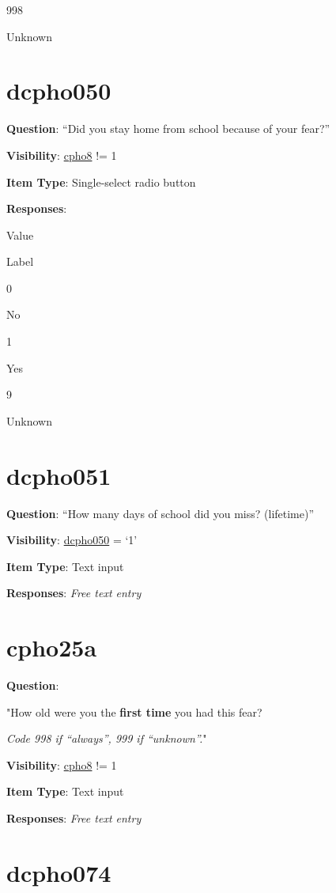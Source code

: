 \documentclass[]{book}
\begin{document}
998

Unknown

\hypertarget{dcpho050}{%
\section{dcpho050}\label{dcpho050}}

\textbf{Question}: ``Did you stay home from school because of your fear?''

\textbf{Visibility}: \protect\hyperlink{cpho8}{cpho8} != 1

\textbf{Item Type}: Single-select radio button

\textbf{Responses}:

Value

Label

0

No

1

Yes

9

Unknown

\hypertarget{dcpho051}{%
\section{dcpho051}\label{dcpho051}}

\textbf{Question}: ``How many days of school did you miss? (lifetime)''

\textbf{Visibility}: \protect\hyperlink{dcpho050}{dcpho050} = `1'

\textbf{Item Type}: Text input

\textbf{Responses}: \emph{Free text entry}

\hypertarget{cpho25a}{%
\section{cpho25a}\label{cpho25a}}

\textbf{Question}:

"How old were you the \textbf{first time} you had this fear?

\emph{Code 998 if ``always'', 999 if ``unknown''.}"

\textbf{Visibility}: \protect\hyperlink{cpho8}{cpho8} != 1

\textbf{Item Type}: Text input

\textbf{Responses}: \emph{Free text entry}

\hypertarget{dcpho074}{%
\section{dcpho074}\label{dcpho074}}
\end{document}
